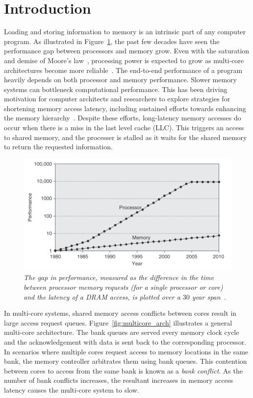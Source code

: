 \section{Introduction}
\label{sec:intro}
Loading and storing information to memory is an intrinsic part of any computer program. As illustrated in Figure~\ref{fig:cpuvsmemory}, the past few decades have seen the performance gap between processors and memory grow. Even with the saturation and demise of Moore's law~\cite{Wulf1995, waldrop2016, MooreMITR}, processing power is expected to grow as multi-core architectures become more reliable~\cite{Geer}. The end-to-end performance of a program heavily depends on both processor and memory performance. Slower memory systems can bottleneck computational performance. This has been driving motivation for computer architects and researchers to explore strategies for shortening memory access latency, including sustained efforts towards enhancing the memory hierarchy~\cite{Burger}. Despite these efforts, long-latency memory accesses do occur when there is a miss in the last level cache (LLC). This triggers an access to shared memory, and the processer is stalled as it waits for the shared memory to return the requested information. 

\begin{figure}[t!]
\centering
\includegraphics[width=0.7\linewidth]{fig/cpuvsmemory.jpg}
\caption{\it{The gap in performance, measured as the difference in the time 
between processor memory requests (for a single processor or core) and the 
latency of a DRAM access, is plotted over a $30$ year span~\cite{comparchbook}.}}
\label{fig:cpuvsmemory}
\end{figure}
In multi-core systems, shared memory access conflicts between cores result in large access request queues. Figure~\ref{fig:multicore_arch}  illustrates a general multi-core architecture. The bank queues are served every memory clock cycle and the acknowledgement with data is sent back to the corresponding processor. In scenarios where multiple cores request access to memory locations in the same bank, the memory controller arbitrates them using bank queues. This contention between cores to access from the same bank is known as a {\em bank conflict}. As the number of bank conflicts increases, the resultant increases in memory access latency causes the multi-core system to slow.

